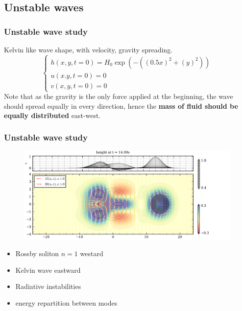 \documentclass[numbering=fraction]{beamer}
\begin{document}
\subsection{Unstable waves}
\begin{frame}
    \frametitle{Unstable wave study}
    Kelvin like wave shape, with velocity, gravity spreading.
    \begin{equation}
        \label{eq:sharp wave}
        \begin{cases}
            h(x,y,t = 0) = H_0  \exp(- ((0.5x) ^2 +(y)^ 2)) \\
            u(x.y, t = 0) = 0                               \\
            v(x,y,t=0) = 0
        \end{cases}
    \end{equation}
    Note that as the gravity is the only force applied at the beginning, the wave should spread equally in every direction, hence the \textbf{mass of fluid should be equally distributed} east-west.

\end{frame}
\begin{frame}
    \frametitle{Unstable wave study}
    \begin{figure}[H]
        \centering
        \includegraphics[width=\textwidth]{./figure/kelvin_wave_0_speed.png}
    \end{figure}
    \begin{itemize}
        \item Rossby soliton $n = 1$ westard
        \item Kelvin wave eastward
        \item Radiative instabilities
        \item energy repartition between modes
    \end{itemize}
\end{frame}
\end{document}
